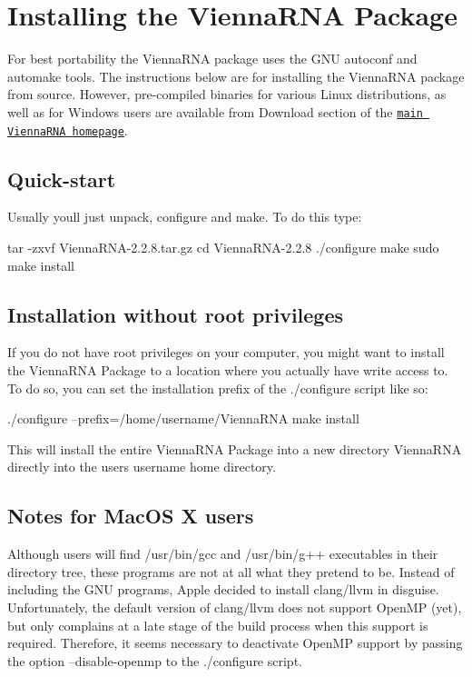 \hypertarget{install_installation}{}\section{Installing the Vienna\+R\+N\+A Package}\label{install_installation}
For best portability the Vienna\+R\+NA package uses the G\+NU autoconf and automake tools. The instructions below are for installing the Vienna\+R\+NA package from source. However, pre-\/compiled binaries for various Linux distributions, as well as for Windows users are available from Download section of the \href{https://www.tbi.univie.ac.at/RNA}{\tt main Vienna\+R\+NA homepage}.\hypertarget{install_quickstart}{}\subsection{Quick-\/start}\label{install_quickstart}
Usually you\textquotesingle{}ll just unpack, configure and make. To do this type\+:

\begin{DoxyVerb}tar -zxvf ViennaRNA-2.2.8.tar.gz
cd ViennaRNA-2.2.8
./configure
make
sudo make install
\end{DoxyVerb}
\hypertarget{install_userdir_install}{}\subsection{Installation without root privileges}\label{install_userdir_install}
If you do not have root privileges on your computer, you might want to install the Vienna\+R\+NA Package to a location where you actually have write access to. To do so, you can set the installation prefix of the ./configure script like so\+:

\begin{DoxyVerb}./configure --prefix=/home/username/ViennaRNA
make install
\end{DoxyVerb}


This will install the entire Vienna\+R\+NA Package into a new directory Vienna\+R\+NA directly into the users username home directory.\hypertarget{install_macosx_notes}{}\subsection{Notes for Mac\+O\+S X users}\label{install_macosx_notes}
Although users will find /usr/bin/gcc and /usr/bin/g++ executables in their directory tree, these programs are not at all what they pretend to be. Instead of including the G\+NU programs, Apple decided to install clang/llvm in disguise. Unfortunately, the default version of clang/llvm does not support Open\+MP (yet), but only complains at a late stage of the build process when this support is required. Therefore, it seems necessary to deactivate Open\+MP support by passing the option --disable-\/openmp to the ./configure script.

